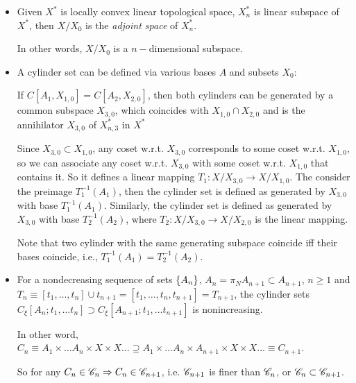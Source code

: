 \documentclass[11pt]{article}
\begin{document}
\begin{itemize}
\item Given $X^{*}$ is locally convex linear topological space, $X_{n}^{*}$ is linear subspace of $X^{*}$, then $X/X_{0}$ is the \emph{adjoint space} of $X_{n}^{*}$. 

In other words, $X/X_{0}$ is a $n-$dimensional subspace. 

\item A cylinder set can be defined via various bases $A$ and subsets $X_{0}$: \citep{gel2014generalized}

 If $C[A_{1}, X_{1,0}]= C[A_{2}, X_{2,0}]$, then both cylinders can be generated by a common subspace $X_{3,0}$, which coincides with $X_{1,0} \cap X_{2,0}$ and is the annihilator $X_{3,0}$ of $X^{*}_{n,3}$ in $X^{*}$ 

Since $X_{3,0}\subset X_{1,0}$, any coset w.r.t. $X_{3,0}$ corresponds to some coset w.r.t. $X_{1,0}$, so we can associate any  coset w.r.t. $X_{3,0}$ with  some coset w.r.t. $X_{1,0}$ that contains it. So it defines a linear mapping $T_{1}: X/X_{3,0}\rightarrow  X/X_{1,0}$. The consider the preimage $T_{1}^{-1}(A_{1})$, then the cylinder set is defined as generated by $X_{3,0}$ with base $T_{1}^{-1}(A_{1})$. Similarly,   the cylinder set is defined as generated by $X_{3,0}$ with base $T_{2}^{-1}(A_{2})$, where $T_{2}: X/X_{3,0}\rightarrow  X/X_{2,0}$ is the linear mapping.

Note that two cylinder with the same generating subspace coincide iff their bases coincide, i.e.,  $T_{1}^{-1}(A_{1}) = T_{2}^{-1}(A_{2})$.\\
 

\item For a nondecreasing sequence of sets $\left\{A_{n}\right\}$, $A_{n}=  \pi_{N}A_{n+1} \subset A_{n+1}$, $n\ge 1$ and $T_{n}\equiv [t_{1},\ldots, t_{n}]\cup {t_{n+1}}= [t_{1},\ldots, t_{n}, t_{n+1}] =T_{n+1}$, the cylinder sets $C_{\xi}[A_{n}; t_{1},\ldots t_{n}] \supset C_{\xi}[A_{n+1}; t_{1},\ldots t_{n+1}]$ is nonincreasing. 

In other word, $C_{n} \equiv A_{1}\times \ldots A_{n} \times X \times X \ldots \supseteq A_{1}\times \ldots A_{n} \times A_{n+1} \times X \times X \ldots \equiv C_{n+1}$.

So for any $C_{n} \in {\mathscr C}_{n} \Rightarrow C_{n}\in {\mathscr C}_{n+1}$, i.e. ${\mathscr C}_{n+1}$ is finer than ${\mathscr C}_{n}$, or ${\mathscr C}_{n}\subset {\mathscr C}_{n+1}$.
\end{itemize}
\end{document}
